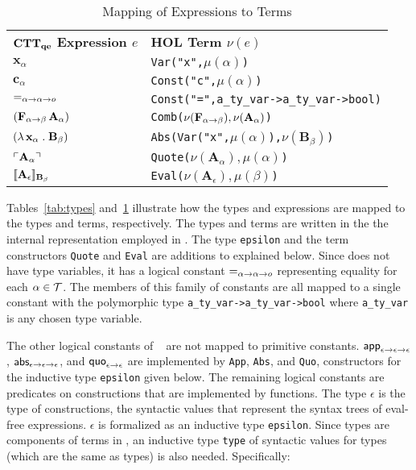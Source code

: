 \documentclass[fleqn]{llncs}
\begin{document}
\begin{table}[t]
\bc
\begin{tabular}{|ll|}
\hline
\textbf{${\bf CTT_{qe}}$ Expression $e$} \hspace*{2ex}
  & \textbf{HOL Term $\nu(e)$}\\
$\textbf{x}_\alpha$
  & \texttt{Var("x",\mbox{$\mu(\alpha)$})}\\
$\textbf{c}_\alpha$
  & \texttt{Const("c",\mbox{$\mu(\alpha)$})}\\
$\mbox{\sf =}_{\alpha \rightarrow \alpha \rightarrow o}$
  & \texttt{Const("=",\texttt{a\_ty\_var->a\_ty\_var->bool})}\\
$(\textbf{F}_{\alpha \rightarrow \beta} \, \textbf{A}_\alpha)$
  & \texttt{Comb(\mbox{\rm $\nu(\textbf{F}_{\alpha \rightarrow \beta}),\nu(\textbf{A}_\alpha)$})}\\
$(\lambda\, \textbf{x}_\alpha \mathrel. \textbf{B}_\beta)$
  & \texttt{Abs(Var("x",\mbox{$\mu(\alpha)$}),\mbox{\rm $\nu(\textbf{B}_\beta)$})}\\
$\ulcorner\textbf{A}_\alpha\urcorner$
  & \texttt{Quote(\mbox{\rm $\nu(\textbf{A}_\alpha),\mu(\alpha)$})}\\
$\llbracket\textbf{A}_\epsilon\rrbracket_{{\bf B}_\beta}$
  & \texttt{Eval(\mbox{\rm $\nu(\textbf{A}_\epsilon),\mu(\beta)$})}\\
\hline
\end{tabular}
\ec
\caption{Mapping of {\churchqe} Expressions to {\HOL} Terms}\label{tab:expressions} 
\end{table}

Tables~\ref{tab:types} and~\ref{tab:expressions} illustrate how the
{\churchqe} types and expressions are mapped to the {\HOL} types and
terms, respectively.  The {\HOL} types and terms are written in the
the internal representation employed in {\HLQE}.  The type
\texttt{epsilon} and the term constructors \texttt{Quote} and
\texttt{Eval} are additions to {\HL} explained below.  Since
{\churchqe} does not have type variables, it has a logical constant
$\mbox{\sf =}_{\alpha \rightarrow \alpha \rightarrow o}$ representing equality
for each $\alpha \in \mbox{$\cal T$}$.  The members of this family of constants
are all mapped to a single {\HOL} constant with the polymorphic type
\texttt{a\_ty\_var->a\_ty\_var->bool} where \texttt{a\_ty\_var} is any
chosen {\HOL} type variable.  

The other logical constants of {\churchqe}~\cite[Table 1]{Farmer18}
are not mapped to primitive {\HOL} constants.  $\mbox{\sf app}_{\epsilon
  \rightarrow \epsilon \rightarrow \epsilon}$, $\mbox{\sf abs}_{\epsilon \rightarrow
  \epsilon \rightarrow \epsilon}$, and $\mbox{\sf quo}_{\epsilon \rightarrow
  \epsilon}$ are implemented by \texttt{App}, \texttt{Abs}, and
\texttt{Quo}, constructors for the inductive type \texttt{epsilon}
given below.  The remaining logical constants are predicates on
constructions that are implemented by {\HOL} functions.
The {\churchqe} type $\epsilon$ is the type of constructions, the
syntactic values that represent the syntax trees of eval-free
expressions.  $\epsilon$ is formalized as an inductive type
\texttt{epsilon}.  Since types are components of terms in
{\HL}, an inductive type \texttt{type} of syntactic values for
{\HLQE} types (which are the same as {\HOL} types) is also
needed.  Specifically:
\end{document}
